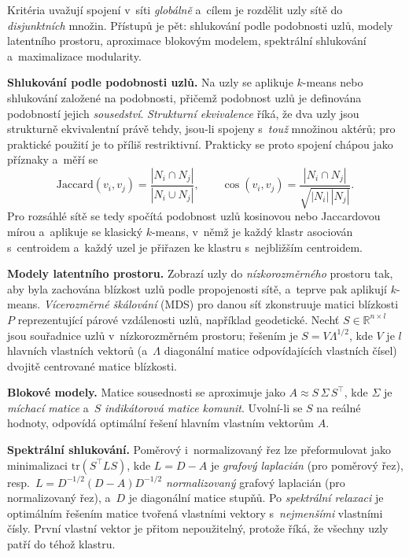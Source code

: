 \documentclass[11pt,a4paper]{article}
\theoremstyle{definition}
\begin{document}
\begin{defbox}
Kritéria uvažují spojení v~síti \emph{globálně} a~cílem je rozdělit uzly sítě do
\emph{disjunktních} množin. Přístupů je pět: shlukování podle podobnosti uzlů, modely
latentního prostoru, aproximace blokovým modelem, spektrální shlukování a~maximalizace
modularity.

\textbf{Shlukování podle podobnosti uzlů.} Na uzly se aplikuje $k$-means nebo shlukování
založené na podobnosti, přičemž podobnost uzlů je definována podobností jejich
\emph{sousedství}. \emph{Strukturní ekvivalence} říká, že dva uzly jsou strukturně ekvivalentní
právě tehdy, jsou-li spojeny s~\emph{touž} množinou aktérů; pro praktické použití je to příliš
restriktivní. Prakticky se proto spojení chápou jako příznaky a~měří se
\[ \mathrm{Jaccard}(v_i,v_j)=\frac{|N_i\cap N_j|}{|N_i\cup N_j|},\qquad
   \cos(v_i,v_j)=\frac{|N_i\cap N_j|}{\sqrt{|N_i|\,|N_j|}}. \]
Pro rozsáhlé sítě se tedy spočítá podobnost uzlů kosinovou nebo Jaccardovou mírou a~aplikuje
se klasický $k$-means, v~němž je každý klastr asociován s~centroidem a~každý uzel je přiřazen ke
klastru s~nejbližším centroidem.

\textbf{Modely latentního prostoru.} Zobrazí uzly do \emph{nízkorozměrného} prostoru tak, aby
byla zachována blízkost uzlů podle propojenosti sítě, a~teprve pak aplikují $k$-means.
\emph{Vícerozměrné škálování} (MDS) pro danou síť zkonstruuje matici blízkosti $P$
reprezentující párové vzdálenosti uzlů, například geodetické. Nechť $S\in\mathbb R^{n\times l}$
jsou souřadnice uzlů v~nízkorozměrném prostoru; řešením je $S=V\Lambda^{1/2}$, kde $V$ je $l$
hlavních vlastních vektorů (a~$\Lambda$ diagonální matice odpovídajících vlastních čísel)
dvojitě centrované matice blízkosti.

\textbf{Blokové modely.} Matice sousednosti se aproximuje jako $A\approx S\,\Sigma\,S^{\!\top}$,
kde $\Sigma$ je \emph{míchací matice} a~$S$ \emph{indikátorová matice komunit}. Uvolní-li se
$S$ na reálné hodnoty, odpovídá optimální řešení hlavním vlastním vektorům $A$.

\textbf{Spektrální shlukování.} Poměrový i~normalizovaný řez lze přeformulovat jako minimalizaci
$\mathrm{tr}(S^{\!\top}LS)$, kde $L=D-A$ je \emph{grafový laplacián} (pro poměrový řez), resp.\
$L=D^{-1/2}(D-A)D^{-1/2}$ \emph{normalizovaný} grafový laplacián (pro normalizovaný řez), a~$D$
je diagonální matice stupňů. Po \emph{spektrální relaxaci} je optimálním řešením matice tvořená
vlastními vektory s~\emph{nejmenšími} vlastními čísly. První vlastní vektor je přitom
nepoužitelný, protože říká, že všechny uzly patří do téhož klastru.


\end{defbox}
\end{document}
